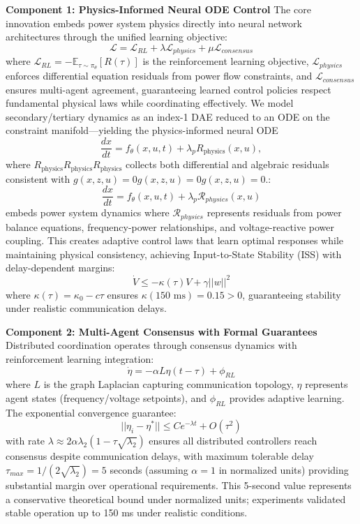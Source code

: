 \documentclass[12pt]{article}
\begin{document}
\textbf{Component 1: Physics-Informed Neural ODE Control}
The core innovation embeds power system physics directly into neural network architectures through the unified learning objective:
$$\mathcal{L} = \mathcal{L}_{RL} + \lambda \mathcal{L}_{physics} + \mu \mathcal{L}_{consensus}$$
where $\mathcal{L}_{RL} = -\mathbb{E}_{\tau \sim \pi_\theta}[R(\tau)]$ is the reinforcement learning objective, $\mathcal{L}_{physics}$ enforces differential equation residuals from power flow constraints, and $\mathcal{L}_{consensus}$ ensures multi-agent agreement, guaranteeing learned control policies respect fundamental physical laws while coordinating effectively. We model secondary/tertiary dynamics as an index-1 DAE reduced to an ODE on the constraint manifold—yielding the physics-informed neural ODE
\begin{equation}
\frac{dx}{dt}=f_\theta(x,u,t)+\lambda_p R_{\text{physics}}(x,u),
\end{equation}
where $R_{\text{physics}}R_{\text{physics}}R_{\text{physics}}$ collects both differential and algebraic residuals consistent with $g(x,z,u)=0g(x,z,u)=0g(x,z,u)=0$.:
$$\frac{dx}{dt} = f_\theta(x, u, t) + \lambda_p \mathcal{R}_{physics}(x, u)$$
embeds power system dynamics where $\mathcal{R}_{physics}$ represents residuals from power balance equations, frequency-power relationships, and voltage-reactive power coupling. This creates adaptive control laws that learn optimal responses while maintaining physical consistency, achieving Input-to-State Stability (ISS) with delay-dependent margins:
$$\dot{V} \leq -\kappa(\tau)V + \gamma||w||^2$$
where $\kappa(\tau) = \kappa_0 - c\tau$ ensures $\kappa(150\text{ ms}) = 0.15 > 0$, guaranteeing stability under realistic communication delays.

\textbf{Component 2: Multi-Agent Consensus with Formal Guarantees}
Distributed coordination operates through consensus dynamics with reinforcement learning integration:
$$\dot{\eta} = -\alpha L \eta(t-\tau) + \phi_{RL}$$
where $L$ is the graph Laplacian capturing communication topology, $\eta$ represents agent states (frequency/voltage setpoints), and $\phi_{RL}$ provides adaptive learning. The exponential convergence guarantee:
$$||\eta_i - \eta^*|| \leq Ce^{-\lambda t} + O(\tau^2)$$
with rate $\lambda \approx 2\alpha\lambda_2(1 - \tau\sqrt{\lambda_2})$ ensures all distributed controllers reach consensus despite communication delays, with maximum tolerable delay $\tau_{max} = 1/(2\sqrt{\lambda_2}) = 5$ seconds (assuming $\alpha = 1$ in normalized units) providing substantial margin over operational requirements. This 5-second value represents a conservative theoretical bound under normalized units; experiments validated stable operation up to 150 ms under realistic conditions.
\end{document}
